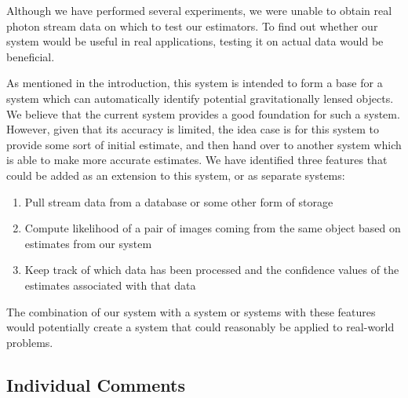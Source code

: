 \documentclass[a4paper,11pt]{article}
\begin{document}
Although we have performed several experiments, we were unable to obtain real
photon stream data on which to test our estimators. To find out whether our
system would be useful in real applications, testing it on actual data would be
beneficial.

As mentioned in the introduction, this system is intended to form a base for a
system which can automatically identify potential gravitationally lensed
objects. We believe that the current system provides a good foundation for such
a system. However, given that its accuracy is limited, the idea case is for this
system to provide some sort of initial estimate, and then hand over to another
system which is able to make more accurate estimates. We have identified three
features that could be added as an extension to this system, or as separate
systems:
\begin{enumerate}
\item Pull stream data from a database or some other form of storage
\item Compute likelihood of a pair of images coming from the same object based on
   estimates from our system
\item Keep track of which data has been processed and the confidence
   values of the estimates associated with that data
\end{enumerate}
The combination of our system with a system or systems with these features would
potentially create a system that could reasonably be applied to real-world problems.
\subsection{Individual Comments}
\label{sec-9-2}
\end{document}
